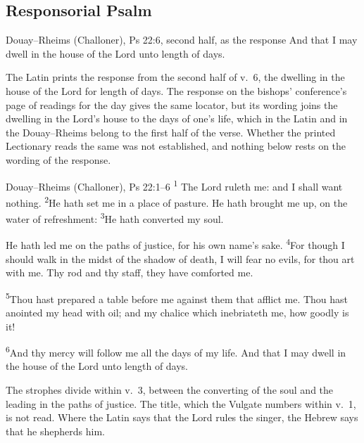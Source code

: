 \subsection{Responsorial Psalm}
\label{proper-responsorial-psalm}


\begin{englishwitness}{Douay--Rheims (Challoner), Ps 22:6, second half, as the response}
 And that I may
dwell in the house of the Lord unto length of days.
\end{englishwitness}

\noindent The Latin  prints the response from the second half of
v.~6, the dwelling in the house of the Lord for length of days. The response on
the bishops' conference's page of readings for the day gives the same
locator, but its wording joins the dwelling in the Lord's house to the days of
one's life, which in the Latin and in the Douay--Rheims belong to the first
half of the verse. Whether the printed Lectionary reads the same was not
established, and nothing below rests on the wording of the response.

\begin{englishwitness}{Douay--Rheims (Challoner), Ps 22:1--6}
\textsuperscript{1} The Lord ruleth me: and I
shall want nothing. \textsuperscript{2}He hath set me in a place of pasture. He
hath brought me up, on the water of refreshment: \textsuperscript{3}He hath
converted my soul.

He hath led me on the paths of justice, for his own name's sake.
\textsuperscript{4}For though I should walk in the midst of the shadow of
death, I will fear no evils, for thou art with me. Thy rod and thy staff, they
have comforted me.

\textsuperscript{5}Thou hast prepared a table before me against them that
afflict me. Thou hast anointed my head with oil; and my chalice which
inebriateth me, how goodly is it!

\textsuperscript{6}And thy mercy will follow me all the days of my life. And
that I may dwell in the house of the Lord unto length of days.
\end{englishwitness}

\noindent The strophes divide within v.~3, between the converting of the soul
and the leading in the paths of justice. The title, which the Vulgate numbers
within v.~1, is not read. Where the Latin says that the Lord rules the singer,
the Hebrew says that he shepherds him.

